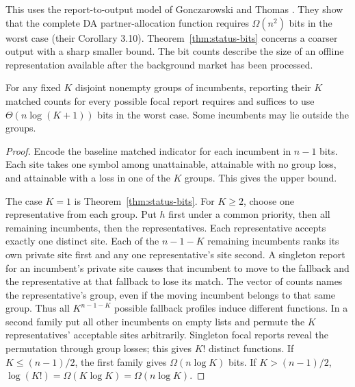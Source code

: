 This uses the report-to-output model of Gonczarowski and Thomas \cite{gtcomplexity}. They show that the complete DA partner-allocation function requires $\Omega(n^2)$ bits in the worst case (their Corollary 3.10). Theorem~\ref{thm:status-bits} concerns a coarser output with a sharp smaller bound. The bit counts describe the size of an offline representation available after the background market has been processed.

\begin{corollary}\label{cor:group-bits}
For any fixed $K$ disjoint nonempty groups of incumbents, reporting their $K$ matched counts for every possible focal report requires and suffices to use $\Theta(n\log(K+1))$ bits in the worst case. Some incumbents may lie outside the groups.
\end{corollary}
\begin{proof}
Encode the baseline matched indicator for each incumbent in $n-1$ bits. Each site takes one symbol among unattainable, attainable with no group loss, and attainable with a loss in one of the $K$ groups. This gives the upper bound.

The case $K=1$ is Theorem~\ref{thm:status-bits}. For $K\ge 2$, choose one representative from each group. Put $h$ first under a common priority, then all remaining incumbents, then the representatives. Each representative accepts exactly one distinct site. Each of the $n-1-K$ remaining incumbents ranks its own private site first and any one representative's site second. A singleton report for an incumbent's private site causes that incumbent to move to the fallback and the representative at that fallback to lose its match. The vector of counts names the representative's group, even if the moving incumbent belongs to that same group. Thus all $K^{n-1-K}$ possible fallback profiles induce different functions. In a second family put all other incumbents on empty lists and permute the $K$ representatives' acceptable sites arbitrarily. Singleton focal reports reveal the permutation through group losses; this gives $K!$ distinct functions. If $K\le(n-1)/2$, the first family gives $\Omega(n\log K)$ bits. If $K>(n-1)/2$, $\log(K!)=\Omega(K\log K)=\Omega(n\log K)$.
\end{proof}
